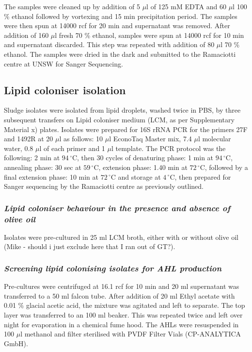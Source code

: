 \documentclass[twoside]{article}
\begin{document}
The samples were cleaned up by addition of 5 $\mu$l of 125 mM EDTA and 60 $\mu$l 100 \% ethanol followed by vortexing and 15 min precipitation period. The samples were then spun at 14000 rcf for 20 min and supernatant was removed. After addition of 160 $\mu$l fresh 70 \% ethanol, samples were spun at 14000 rcf for 10 min and supernatant discarded. This step was repeated with addition of 80 $\mu$l 70 \% ethanol. The samples were dried in the dark and submitted to the Ramaciotti centre at UNSW for Sanger Sequencing.

\subsection{Lipid coloniser isolation}
Sludge isolates  were isolated from lipid droplets, washed twice in PBS, by three subsequent transfers on Lipid coloniser medium (LCM, as per Supplementary Material x) plates. Isolates were prepared for 16S rRNA PCR for the primers 27F and 1492R at 20 $\mu$l as follows: 10 $\mu$l EconoTaq Master mix, 7.4 $\mu$l molecular water, 0.8 $\mu$l of each primer and 1 $\mu$l template. The PCR protocol was the following: 2 min at $94\,^{\circ}\mathrm{C}$, then 30 cycles of denaturing phase: 1 min at $94\,^{\circ}\mathrm{C}$, annealing phase: 30 sec at  $59\,^{\circ}\mathrm{C}$, extension phase: 1.40 min at $72\,^{\circ}\mathrm{C}$, followed by a final extension phase: 10 min at $72\,^{\circ}\mathrm{C}$ and storage at $4\,^{\circ}\mathrm{C}$, then prepared for Sanger sequencing by the Ramaciotti centre as previously outlined.

\subsubsection{\emph{Lipid coloniser behaviour in the presence and absence of olive oil}}
Isolates were pre-cultured in 25 ml LCM broth, either with or without olive oil (Mike - should i just exclude here that I ran out of GT?). 

\subsubsection{\emph{Screening lipid colonising isolates for AHL production}}
Pre-cultures were centrifuged at 16.1 rcf for 10 min and 20 ml supernatant was transferred to a 50 ml falcon tube. After addition of 20 ml Ethyl acetate with 0.01 \% glacial acetic acid, the mixture was agitated and left to separate. The top  layer was transferred to an 100 ml beaker. This was repeated twice and left over night for evaporation in a chemical fume hood. The AHLs were resuspended in 100  $\mu$l methanol and filter sterilised with PVDF Filter Vials (CP-ANALYTICA GmbH). \\
\end{document}
